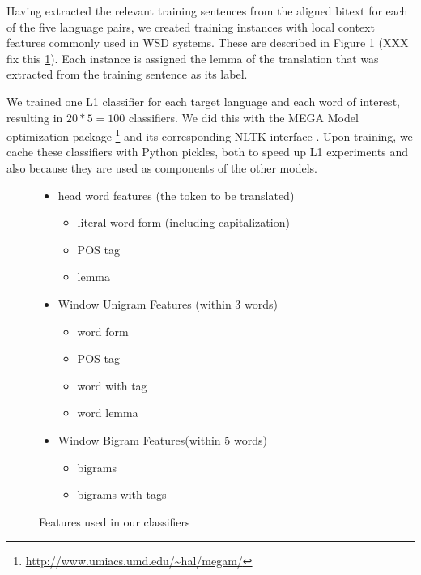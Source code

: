 \documentclass[11pt,letterpaper]{article}
\begin{document}
Having extracted the relevant training sentences from the aligned bitext for
each of the five language pairs, we created training instances with local
context features commonly used in WSD systems. These are described in Figure 1
(XXX fix this \ref{features}). Each instance is assigned the lemma of the
translation that was extracted from the training sentence as its
label.

We trained one L1 classifier for each target language and each word of
interest, resulting in $20*5 = 100$ classifiers. We did this with the MEGA
Model optimization package \cite{daume04cg-bfgs}
\footnote{\url{http://www.umiacs.umd.edu/~hal/megam/}} and its corresponding
NLTK interface \cite{nltkbook}. Upon training, we cache these classifiers with
Python pickles, both to speed up L1 experiments and also because they are used
as components of the other models.

\begin{figure}
  \begin{itemize}  %
  
  \item head word features (the token to be translated)
  \begin{itemize}  %
       \item literal word form (including capitalization)
       \item POS tag
       \item lemma
  \end{itemize}
  \item Window Unigram Features (within 3 words)
  \begin{itemize} %
  		\item word form
  		\item POS tag
  		\item word with tag
  		\item word lemma
  \end{itemize}
  \item Window Bigram Features(within 5 words)
  \begin{itemize} %
  		\item bigrams 
  		\item bigrams with tags
  \end{itemize}  
  
  
  \end{itemize}   %
  \label{features}
  \caption{Features used in our classifiers}
\end{figure}
\end{document}

